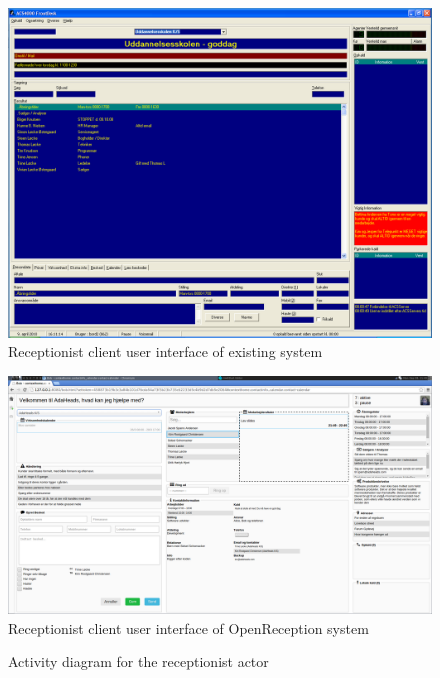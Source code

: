 \begin{figure}
  \centering
 
  \includegraphics[scale=0.2]{img/frontdesk-client-ui.png}
  \caption{Receptionist client user interface of existing system}
  \label{fig:frontdesk-client-ui}
\end{figure}

\begin{figure}
  \includegraphics[scale=0.2]{img/openreception-client-ui.png}
  \caption{Receptionist client user interface of OpenReception system}
  \label{fig:openreception-client-ui}
\end{figure}

\begin{figure}[h]
\centering
\caption{Activity diagram for the receptionist actor}
\label{fig:activity_diagram_receptionist}
\end{figure}


